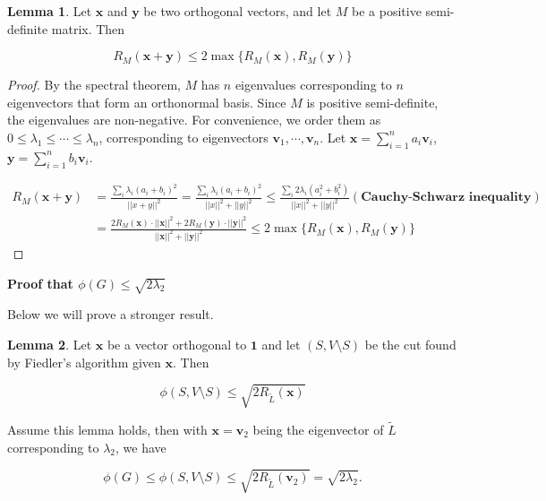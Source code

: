 \documentclass[a4paper]{article}
\theoremstyle{definition}
\newtheorem{lemma}{Lemma}[section]
\begin{document}
\begin{lemma}
Let $\textbf{x}$ and $\textbf{y}$ be two orthogonal vectors, and let $M$ be a positive semi-definite matrix. Then 

\begin{equation}
    R_{M}(\textbf{x}+\textbf{y}) \leq 2\max\{R_{M}(\textbf{x}), R_{M}(\textbf{y})\}
\end{equation}
\end{lemma}

\begin{proof}
By the spectral theorem, $M$ has $n$ eigenvalues corresponding to $n$ eigenvectors that form an orthonormal basis. Since $M$ is positive semi-definite, the eigenvalues are non-negative. For convenience, we order them as $0\leq \lambda_1\leq \cdots \leq \lambda_n$, corresponding to eigenvectors $\textbf{v}_1,\cdots, \textbf{v}_n$. Let $\textbf{x}=\sum_{i=1}^{n}a_i\textbf{v}_i$, $\textbf{y}=\sum_{i=1}^{n}b_i\textbf{v}_i$.

\begin{align}
    R_{M}(\textbf{x} + \textbf{y}) &= \frac{\sum_{i}\lambda_i(a_i+b_i)^2}{||x+y||^2} = \frac{\sum_{i}\lambda_i(a_i+b_i)^2}{||x||^2+||y||^2} \leq \frac{\sum_{i}2\lambda_i(a_i^2+b_i^2)}{||x||^2+||y||^2} (\textbf{Cauchy-Schwarz inequality})\\
    &= \frac{2R_{M}(\textbf{x})\cdot ||\textbf{x}||^2 + 2R_{M}(\textbf{y})\cdot ||\textbf{y}||^2}{||\textbf{x}||^2+||\textbf{y}||^2} \leq 2\max\{R_{M}(\textbf{x}), R_{M}(\textbf{y})\}
\end{align}
\end{proof}

\textbf{Proof that $\phi(G)\leq \sqrt{2\lambda_2}$}

Below we will prove a stronger result.

\begin{lemma}
Let $\textbf{x}$ be a vector orthogonal to $\textbf{1}$ and let $(S, V\setminus S)$ be the cut found by Fiedler's algorithm given $\textbf{x}$. Then

\begin{equation}
    \phi(S, V\setminus S)\leq \sqrt{2R_{\tilde{L}}(\textbf{x})}
\end{equation}
\end{lemma}

Assume this lemma holds, then with $\textbf{x}=\textbf{v}_2$ being the eigenvector of $\tilde{L}$ corresponding to $\lambda_2$, we have 

\begin{equation}
    \phi(G)\leq \phi(S, V\setminus S)\leq \sqrt{2R_{\tilde{L}}(\textbf{v}_2)}=\sqrt{2\lambda_2}.
\end{equation}
\end{document}
